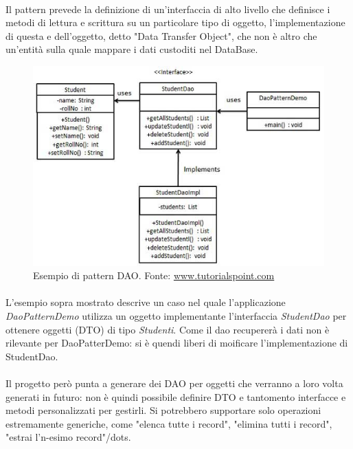\documentclass[a4paper, 12pt]{report}
\begin{document}
    \paragraph*{}
    Il pattern prevede la definizione di un'interfaccia di alto livello che definisce i metodi di lettura e scrittura su un particolare tipo di oggetto, l'implementazione di questa e dell'oggetto, detto "Data Transfer Object", che non è altro che un'entità sulla quale mappare i dati custoditi nel DataBase.
    \begin{figure}[H]
      \includegraphics[width=\textwidth]{dao_pattern_uml_diagram.jpg}
      \caption{Esempio di pattern DAO. Fonte: \href{https://www.tutorialspoint.com/design_pattern/images/dao_pattern_uml_diagram.jpg}{www.tutorialspoint.com}}
    \end{figure}
    \paragraph*{}
    L'esempio sopra mostrato descrive un caso nel quale l'applicazione \emph{DaoPatternDemo} utilizza un oggetto implementante l'interfaccia \emph{StudentDao} per ottenere oggetti (DTO) di tipo \emph{Studenti}.
    Come il dao recupererà i dati non è rilevante per DaoPatterDemo: si è quendi liberi di moificare l'implementazione di StudentDao.
    \paragraph*{}
    Il progetto però punta a generare dei DAO per oggetti che verranno a loro volta generati in futuro: non è quindi possibile definire DTO e tantomento interfacce e metodi personalizzati per gestirli.
    Si potrebbero supportare solo operazioni estremamente generiche, come "elenca tutte i record", "elimina tutti i record", "estrai l'n-esimo record"/dots.
\end{document}
